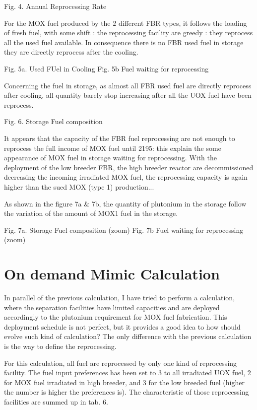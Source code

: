 \documentclass[12pt]{article}
\begin{document}
 
Fig. 4. Annual Reprocessing Rate


 For the MOX fuel produced by the 2 different FBR types, it follows the loading of fresh fuel, with some shift : the reprocessing facility are greedy : they reprocess all the used fuel available. In consequence there is no FBR used fuel in storage they are directly reprocess after the cooling.




Fig. 5a. Used FUel in Cooling			Fig. 5b Fuel waiting for reprocessing



Concerning the fuel in storage, as almost all FBR used fuel are directly reprocess after cooling, all quantity barely stop increasing after all the UOX fuel have been reprocess. 

Fig. 6. Storage Fuel composition

It appears that the capacity of the FBR fuel reprocessing are not enough to reprocess the full income of MOX fuel until 2195: this explain the some appearance of MOX fuel in storage waiting for reprocessing. With the deployment of the low breeder FBR, the high breeder reactor are decommissioned decreasing the incoming irradiated MOX fuel,  the reprocessing capacity is again higher than the sued MOX (type 1) production...


As shown in the figure 7a \& 7b, the quantity of plutonium in the storage follow the variation of the amount of MOX1 fuel in the storage.
	

Fig. 7a. Storage Fuel composition (zoom)		Fig. 7b Fuel waiting for reprocessing (zoom)		 

\section{On demand Mimic Calculation}
In parallel of the previous calculation, I have tried to perform a calculation, where the separation facilities have limited capacities and are deployed accordingly to the plutonium requirement for MOX fuel fabrication. This deployment schedule is not perfect, but it provides a good idea to how should evolve such kind of calculation? 
The only difference with the previous calculation is the way to define the reprocessing.

For this calculation, all fuel are reprocessed by only one kind of reprocessing facility. The fuel input preferences has been set to 3 to all irradiated UOX fuel, 2 for MOX fuel irradiated in high breeder, and 3 for the low breeded fuel (higher the number is higher the preferences is). The characteristic of those reprocessing facilities are summed up in tab. 6.
\end{document}
